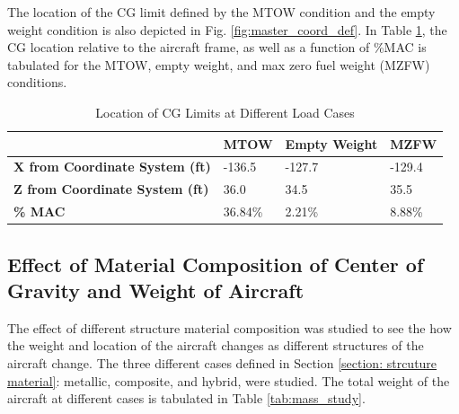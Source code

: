 \clearpage
The location of the CG limit defined by the MTOW condition and the empty weight condition is also depicted in Fig. \ref{fig:master_coord_def}. In Table \ref{tab:cg_final}, the CG location relative to the aircraft frame, as well as a function of \%MAC is tabulated for the MTOW, empty weight, and max zero fuel weight (MZFW) conditions.

\begin{table}[!h]
\centering
\caption{Location of CG Limits at Different Load Cases}
\begin{tabular}{|l||l|l|l|}
\hline
 & \textbf{MTOW} & \textbf{Empty Weight} & \textbf{MZFW} \\ \hline \hline
\textbf{X from Coordinate System (ft)} & -136.5 & -127.7 & -129.4 \\ \hline
\textbf{Z from Coordinate System (ft)} & 36.0 & 34.5 & 35.5 \\ \hline
\textbf{\% MAC} & 36.84\% & 2.21\% & 8.88\% \\ 
\bottomrule
\end{tabular}
\label{tab:cg_final}
\end{table}

\subsection{Effect of Material Composition of Center of Gravity and Weight of Aircraft}
The effect of different structure material composition was studied to see the how the weight and location of the aircraft changes as different structures of the aircraft change. The three different cases defined in Section \ref{section: strcuture material}: metallic, composite, and hybrid, were studied. The total weight of the aircraft at different cases is tabulated in Table \ref{tab:mass_study}. 

